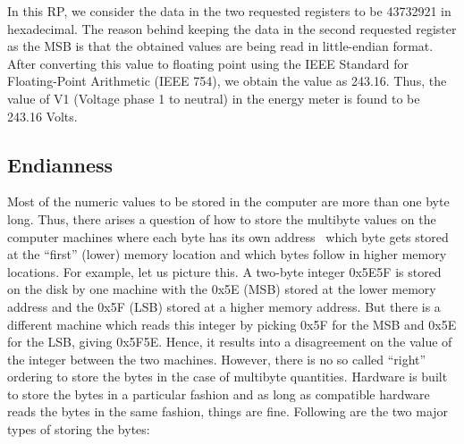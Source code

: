 In this RP, we consider the data in the two requested registers to be 43732921 
in hexadecimal. The reason behind keeping the data in the second requested register 
as the MSB is that the obtained values are being read in little-endian format.
After converting this value to floating point using the 
IEEE Standard for Floating-Point Arithmetic (IEEE 754), we obtain the 
value as 243.16. Thus, the value of V1 (Voltage phase 1 to neutral) in the 
energy meter is found to be 243.16 Volts. 

\subsection{Endianness}
Most of the numeric values to be stored in the computer are more than
one byte long. Thus, there arises a question of how to store the
multibyte values on the computer machines where each byte has its own
address \ie\ which byte gets stored at the ``first'' (lower) memory
location and which bytes follow in higher memory locations. For
example, let us picture this. A two-byte integer 0x5E5F is stored on the 
disk by one machine with the 0x5E (MSB) stored at the lower 
memory address and the 0x5F (LSB) stored at a higher memory address. 
But there is a different machine which reads this integer by 
picking 0x5F for the MSB and 0x5E for the LSB, giving 0x5F5E. 
Hence, it results into a disagreement on the value of the integer 
between the two machines. However, there is no so called ``right'' 
ordering to store the bytes in the case of multibyte quantities. 
Hardware is built to store the bytes in a particular fashion and as long as compatible
hardware reads the bytes in the same fashion, things are
fine. Following are the two major types of storing the bytes: 

